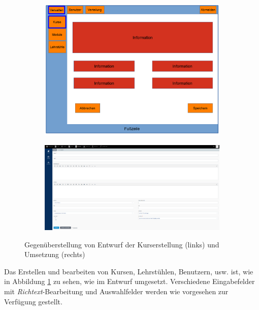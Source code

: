         \begin{figure}
            \centering
            \begin{subfigure}{0.49\textwidth}
                \includegraphics[width=1.0\textwidth]{./implementation/images/MockUpsBackend/backendEdit.png}
            \end{subfigure}
            \begin{subfigure}{0.49\textwidth}
                \includegraphics[width=1.0\textwidth]{./implementation/images/edit.png}
            \end{subfigure}
            \caption{Gegenüberstellung von Entwurf der Kurserstellung (links) und Umsetzung (rechts)}
            \label{fig:comparisonEdit}
        \end{figure}
    
        Das Erstellen und bearbeiten von Kursen, Lehrstühlen, Benutzern, usw. ist, wie in Abbildung \ref{fig:comparisonEdit} zu sehen, wie im Entwurf umgesetzt.
        Verschiedene Eingabefelder mit \textit{Richtext}-Bearbeitung und Auswahlfelder werden wie vorgesehen zur Verfügung gestellt.
    
